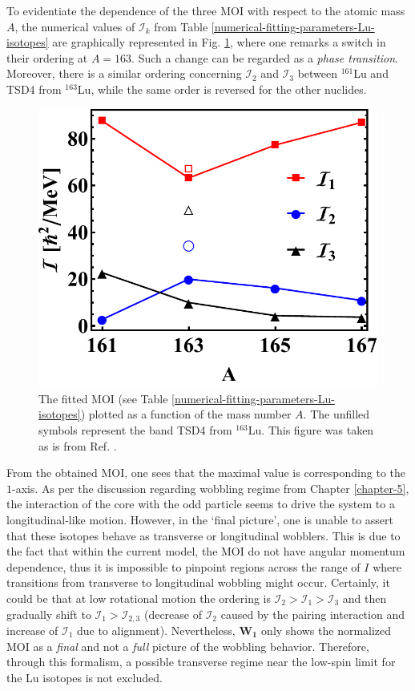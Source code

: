 To evidentiate the dependence of the three MOI with respect to the atomic mass $A$, the numerical values of $\mathcal{I}_k$ from Table \ref{numerical-fitting-parameters-Lu-isotopes} are graphically represented in Fig. \ref{MOIs-A-behavior-Lu-isotopes}, where one remarks a switch in their ordering at $A=163$. Such a change can be regarded as a \emph{phase transition}. Moreover, there is a similar ordering concerning $\mathcal{I}_2$ and $\mathcal{I}_3$ between $^{161}$Lu and TSD4 from $^{163}$Lu, while the same order is reversed for the other nuclides.
\begin{figure}
    \centering
    \includegraphics[scale=0.65]{Chapters/Figures/fig1_moivalues.pdf}
    \caption{The fitted MOI (see Table \ref{numerical-fitting-parameters-Lu-isotopes}) plotted as a function of the mass number $A$. The unfilled symbols represent the band TSD4 from $^{163}$Lu. This figure was taken as is from Ref. \cite{raduta2020approach}.}
    \label{MOIs-A-behavior-Lu-isotopes}
\end{figure}

From the obtained MOI, one sees that the maximal value is corresponding to the $1$-axis. As per the discussion regarding wobbling regime from Chapter \ref{chapter-5}, the interaction of the core with the odd particle seems to drive the system to a longitudinal-like motion. However, in the `final picture', one is unable to assert that these isotopes behave as transverse or longitudinal wobblers. This is due to the fact that within the current model, the MOI do not have angular momentum dependence, thus it is impossible to pinpoint regions across the range of $I$ where transitions from transverse to longitudinal wobbling might occur. Certainly, it could be that at low rotational motion the ordering is $\mathcal{I}_2>\mathcal{I}_1>\mathcal{I}_3$ and then gradually shift to $\mathcal{I}_1>\mathcal{I}_{2,3}$ (decrease of $\mathcal{I}_2$ caused by the pairing interaction and increase of $\mathcal{I}_1$ due to alignment). Nevertheless, $\mathbf{W_1}$ only shows the normalized MOI as a \emph{final} and not a \emph{full} picture of the wobbling behavior. Therefore, through this formalism, a possible transverse regime near the low-spin limit for the Lu isotopes is not excluded.

